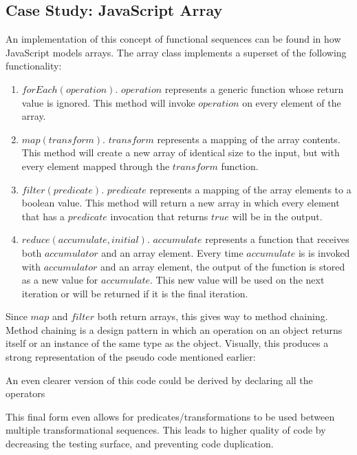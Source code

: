 \subsection{Case Study: JavaScript Array}

An implementation of this concept of functional sequences can be found in how JavaScript models arrays.  The array class implements a superset of the following functionality:

\begin{enumerate}
  \item $forEach(operation)$.  $operation$ represents a generic function whose return value is ignored.  This method will invoke $operation$ on every element of the array.

  \item $map(transform)$.  $transform$ represents a mapping of the array contents.  This method will create a new array of identical size to the input, but with every element mapped through the $transform$ function.

  \item $filter(predicate)$.  $predicate$ represents a mapping of the array elements to a boolean value.  This method will return a new array in which every element that has a $predicate$ invocation that returns $true$ will be in the output.

  \item $reduce(accumulate, initial)$.  $accumulate$ represents a function that receives both $accumulator$ and an array element. Every time $accumulate$ is is invoked with $accumulator$ and an array element, the output of the function is stored as a new value for $accumulate$.  This new value will be used on the next iteration or will be returned if it is the final iteration.

\end{enumerate}

Since $map$ and $filter$ both return arrays, this gives way to method chaining. Method chaining is a design pattern in which an operation on an object returns itself or an instance of the same type as the object. Visually, this produces a strong representation of the pseudo code mentioned earlier:

\begin{minipage}{\linewidth}

\end{minipage} 

An even clearer version of this code could be derived by declaring all the operators

\begin{minipage}{\linewidth}

\end{minipage}

This final form even allows for predicates/transformations to be used between multiple transformational sequences.  This leads to higher quality of code by decreasing the testing surface, and preventing code duplication. 